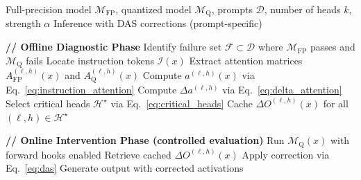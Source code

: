\begin{algorithm}[t]
\caption{Deep Attention Stimulation (DAS)}
\label{alg:das}
\begin{algorithmic}[1]
\Require Full-precision model $\mathcal{M}_{\text{FP}}$, quantized model
$\mathcal{M}_{\text{Q}}$, prompts $\mathcal{D}$, number of heads $k$, strength
$\alpha$
\Ensure Inference with DAS corrections (prompt-specific)

\State \textbf{// Offline Diagnostic Phase}
\State Identify failure set $\mathcal{F} \subset \mathcal{D}$ where $\mathcal{M}_{\text{FP}}$ passes and $\mathcal{M}_{\text{Q}}$ fails
  \State Locate instruction tokens $\mathcal{I}(x)$
  \State Extract attention matrices $A^{(\ell,h)}_{\text{FP}}(x)$ and $A^{(\ell,h)}_{\text{Q}}(x)$
  \State Compute $a^{(\ell,h)}(x)$ via Eq.~\eqref{eq:instruction_attention}
\EndFor
\State Compute $\Delta a^{(\ell,h)}$ via Eq.~\eqref{eq:delta_attention}
\State Select critical heads $\mathcal{H}^\star$ via Eq.~\eqref{eq:critical_heads}
  \State Cache $\Delta O^{(\ell,h)}(x)$ for all $(\ell,h)\in\mathcal{H}^\star$
\EndFor

\State \textbf{// Online Intervention Phase (controlled evaluation)}
 
  \State Run $\mathcal{M}_{\text{Q}}(x)$ with forward hooks enabled
    \State Retrieve cached $\Delta O^{(\ell,h)}(x)$
    \State Apply correction via Eq.~\eqref{eq:das}
  \EndFor
  \State Generate output with corrected activations
\EndFor
\end{algorithmic}
\end{algorithm}
